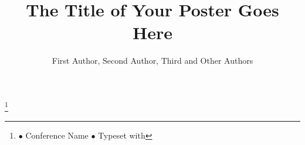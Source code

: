 \documentclass[a0,portrait]{a0poster}
\begin{document}

\title{The Title of Your Poster Goes Here}

\author{First Author, Second Author, Third and Other Authors}

\affiliation{\cfpaddress}


\thanks{\hfill \Wemail \hfill $\bullet$ \hfill Conference Name \hfill $\bullet$ \hfill Typeset with \LaTeXe \hfill}

\makeheader



\end{document}
